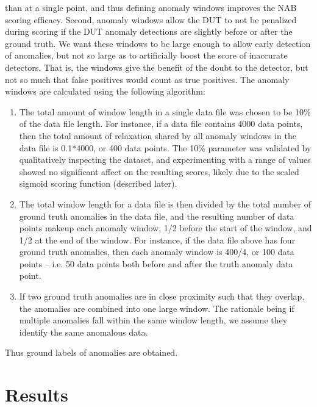\documentclass[12pt]{article}
\begin{document}
than at a single point, and thus defining anomaly windows improves the
NAB scoring efficacy. Second, anomaly windows allow the DUT to not be
penalized during scoring if the DUT anomaly detections are slightly before
or after the ground truth. We want these windows to be large enough to
allow early detection of anomalies, but not so large as to artificially boost
the score of inaccurate detectors. That is, the windows give the benefit of
the doubt to the detector, but not so much that false positives would count
as true positives. The anomaly windows are calculated using the following
algorithm:
\begin{enumerate}
\item The total amount of window length in a single data file was chosen
to be 10\% of the data file length. For instance, if a data file contains
4000 data points, then the total amount of relaxation shared by all
anomaly windows in the data file is 0.1*4000, or 400 data points.
The 10\% parameter was validated by qualitatively inspecting the
dataset, and experimenting with a range of values showed no
significant affect on the resulting scores, likely due to the scaled
sigmoid scoring function (described later).
\item The total window length for a data file is then divided by the total
number of ground truth anomalies in the data file, and the resulting
number of data points makeup each anomaly window, 1/2 before
the start of the window, and 1/2 at the end of the window. For
instance, if the data file above has four ground truth anomalies,
then each anomaly window is 400/4, or 100 data points – i.e. 50
data points both before and after the truth anomaly data point.
\item If two ground truth anomalies are in close proximity such that they
overlap, the anomalies are combined into one large window. The
rationale being if multiple anomalies fall within the same window
length, we assume they identify the same anomalous data.
\end{enumerate}
Thus ground labels of anomalies are obtained. 


\section{Results}
\end{document}
